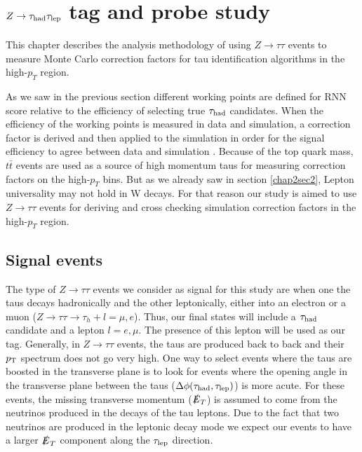 \chapter{$Z\to\tau_\text{had}\tau_\text{lep}$ tag and probe study}\label{chap1}
This chapter describes the analysis methodology of using $Z\to\tau\tau$ events to measure Monte Carlo correction factors for tau identification algorithms in the high-$p_T$ region.

As we saw in the previous section different working points are defined for RNN score relative to the efficiency of selecting true $\tau_\text{had}$ candidates. When the efficiency of the working points is measured in data and simulation, a correction factor is derived and then applied to the simulation in order for the signal efficiency to agree between data and simulation \cite{ATLAS:2017mpa}. Because of the top quark mass, $t\bar{t}$ events are used as a source of high momentum taus for measuring correction factors on the high-$p_T$ bins. But as we already saw in section \ref{chap2sec2}, Lepton universality may not hold in W decays. For that reason our study is aimed to use $Z\to\tau\tau$ events for deriving and cross checking simulation correction factors in the high-$p_T$ region.   

\section{Signal events}\label{chap4sec1}
The type of $Z\to\tau\tau$ events we consider as signal for this study are when one the taus decays hadronically and the other leptonically, either into an electron or a muon ($Z\to\tau\tau\to\tau_h +l=\mu,e$). Thus, our final states will include a $\tau_\text{had}$ candidate and a lepton $l=e,\mu$. The presence of this lepton will be used as our tag. 
Generally, in $Z\to\tau\tau$ events, the taus are produced back to back and their $p_\text{T}$ spectrum does not go very high. One way to select events where the taus are boosted in the transverse plane is to look for events where the opening angle in the transverse plane between the taus ($\Delta\phi(\tau_\text{had},\tau_\text{lep})$) is more acute. For these events, the missing transverse momentum ($\slashed{E}_T$) is assumed to come from the neutrinos produced in the decays of the tau leptons. Due to the fact that two neutrinos are produced in the leptonic decay mode we expect our events to have a larger $\slashed{E}_T$ component along the $\tau_\text{lep}$ direction.

